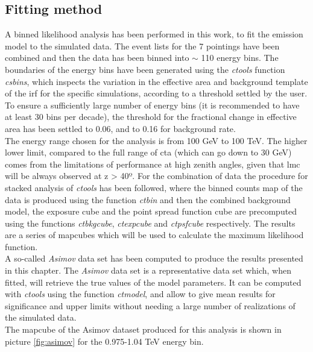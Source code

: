 \documentclass[main.tex]{subfiles}
\begin{document}
\subsection{Fitting method}

A binned likelihood analysis has been performed in this work, to fit the emission model to the simulated data. The event lists for the 7 pointings have been combined and then the data has been binned into $\sim$ 110 energy bins. The boundaries of the energy bins have been generated using the \textit{ctools} function \textit{csbins}, which inspects the variation in the effective area and background template of the \gls{irf} for the specific simulations, according to a threshold settled by the user. To ensure a sufficiently large number of energy bins (it is recommended to have at least 30 bins per decade), the threshold for the fractional change in effective area has been settled to 0.06, and to 0.16 for background rate. \\
The energy range chosen for the analysis is from 100 GeV to 100 TeV. The higher lower limit, compared to the full range of \gls{cta} (which can go down to 30 GeV) comes from the limitations of performance at high zenith angles, given that \gls{lmc} will be always observed at z > 40º.
For the combination of data the procedure for stacked analysis of \textit{ctools} has been followed, where the binned counts map of the data is produced using the function \textit{ctbin} and then the combined background model, the exposure cube and the point spread function cube are precomputed using the functions \textit{ctbkgcube}, \textit{ctexpcube} and \textit{ctpsfcube} respectively. The results are a series of mapcubes which will be used to calculate the maximum likelihood function.\\
A so-called \textit{Asimov} data set has been computed to produce the results presented in this chapter. The \textit{Asimov} data set \cite{2011Asimov} is a representative data set which, when fitted, will retrieve the true values of the model parameters. It can be computed with \textit{ctools} using the function \textit{ctmodel}, and allow to give mean results for significance and upper limits without needing a large number of realizations of the simulated data.\\
The mapcube of the Asimov dataset produced for this analysis is shown in picture \ref{fig:asimov} for the 0.975-1.04 TeV energy bin. 
\end{document}
